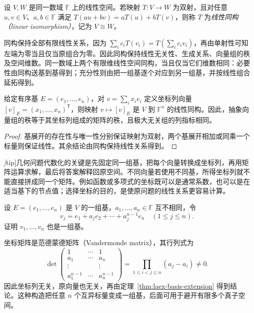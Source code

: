\begin{definition}
\label{def:laex-isomorphism}
设 $V,W$ 是同一数域 $\mathbb F$ 上的线性空间。若映射 $T:V\to W$ 为双射，且对任意 $u,v\in V$、$a,b\in\mathbb F$ 满足 $T(au+bv)=aT(u)+bT(v)$，则称 $T$ 为\emph{线性同构（linear isomorphism）}，记为 $V\cong W$。
\end{definition}

同构保持全部有限线性关系，因为 $\sum_i c_iT(v_i)=T(\sum_i c_iv_i)$，再由单射性可知左端为零当且仅当原组合为零。因此同构保持线性无关性、生成关系、向量组的秩及空间维数。同一数域上两个有限维线性空间同构，当且仅当它们维数相同：必要性由同构送基到基得到；充分性则由把一组基逐个对应到另一组基，并按线性组合延拓得到。

\begin{theorem}
\label{thm:laex-coordinate-isomorphism}
给定有序基 $E=(e_1,\ldots,e_n)$，对 $v=\sum_i x_ie_i$ 定义坐标列向量 $[v]_E=(x_1,\ldots,x_n)^{\mathsf T}$，则映射 $v\mapsto[v]_E$ 是 $V$ 到 $\mathbb F^n$ 的线性同构。因此，抽象向量组的秩等于其坐标列组成的矩阵的秩，且极大无关组的列指标相同。
\end{theorem}

\begin{proof}
基展开的存在性与唯一性分别保证映射为双射，两个基展开相加或同乘一个标量则保证线性。其余结论由同构保持线性关系得到。
\end{proof}

\emph[tip]{几何问题代数化}的关键是先固定同一组基，把每个向量转换成坐标列，再用矩阵运算求解，最后将答案解释回原空间。不同向量若使用不同基，所得坐标列就不能直接拼成同一个矩阵。例如函数或多项式的坐标既可以是通常系数，也可以是在适当基下的节点值；选择坐标的目的，是使原问题的线性关系更容易计算。

\begin{example}
\label{ex:laex-vandermonde-basis}
设 $E=(e_1,\ldots,e_n)$ 是 $V$ 的一组基，$a_1,\ldots,a_n\in\mathbb F$ 互不相同，令
\[
v_j=e_1+a_je_2+\cdots+a_j^{n-1}e_n\quad(1\le j\le n).
\]
证明 $v_1,\ldots,v_n$ 也是一组基。
\end{example}

\begin{solve}
坐标矩阵是范德蒙德矩阵（Vandermonde matrix），其行列式为
\[
\det\begin{pmatrix}
1&\cdots&1\\a_1&\cdots&a_n\\\vdots&&\vdots\\a_1^{n-1}&\cdots&a_n^{n-1}
\end{pmatrix}
=\prod_{1\le i<j\le n}(a_j-a_i)\ne0.
\]
因此坐标列无关，原向量也无关，再由定理~\ref{thm:laex-basis-extension} 得到结论。这种构造把任意 $n$ 个互异标量变成一组基，后面可用于避开有限多个真子空间。
\end{solve}

